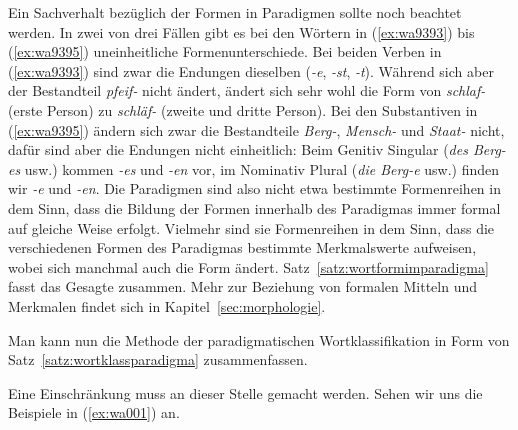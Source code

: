 Ein Sachverhalt bezüglich der Formen in Paradigmen sollte noch beachtet werden.
In zwei von drei Fällen gibt es bei den Wörtern in (\ref{ex:wa9393}) bis (\ref{ex:wa9395}) uneinheitliche Formenunterschiede.
Bei beiden Verben in (\ref{ex:wa9393}) sind zwar die Endungen dieselben (\textit{-e}, \textit{-st}, \textit{-t}).
Während sich aber der Bestandteil \textit{pfeif-} nicht ändert, ändert sich sehr wohl die Form von \textit{schlaf-} (erste Person) zu \textit{schläf-} (zweite und dritte Person).
Bei den Substantiven in (\ref{ex:wa9395}) ändern sich zwar die Bestandteile \textit{Berg-}, \textit{Mensch-} und \textit{Staat-} nicht, dafür sind aber die Endungen nicht einheitlich:
Beim Genitiv Singular (\textit{des Berg-es} usw.) kommen \textit{-es} und \textit{-en} vor, im Nominativ Plural (\textit{die Berg-e} usw.) finden wir \textit{-e} und \textit{-en}.
Die Paradigmen sind also nicht etwa bestimmte Formenreihen in dem Sinn, dass die Bildung der Formen innerhalb des Paradigmas immer formal auf gleiche Weise erfolgt.
Vielmehr sind sie Formenreihen in dem Sinn, dass die verschiedenen Formen des Paradigmas bestimmte Merkmalswerte aufweisen, wobei sich manchmal auch die Form ändert.
Satz~\ref{satz:wortformimparadigma} fasst das Gesagte zusammen.
Mehr zur Beziehung von formalen Mitteln und Merkmalen findet sich in Kapitel~\ref{sec:morphologie}.

\Enl


Man kann nun die Methode der paradigmatischen Wortklassifikation in Form von Satz~\ref{satz:wortklassparadigma} zusammenfassen.



Eine Einschränkung muss an dieser Stelle gemacht werden.
Sehen wir uns die Beispiele in (\ref{ex:wa001}) an.

\begin{exe}
  \ex\label{ex:wa001}\begin{xlist}
  \end{xlist}
\end{exe}

